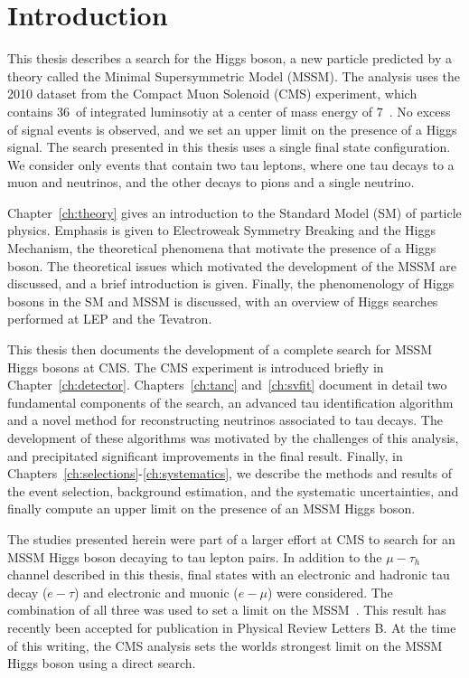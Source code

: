 \ifx\master\undefined\fi
\chapter*{Introduction} 

This thesis describes a search for the Higgs boson, a new particle predicted by
a theory called the Minimal Supersymmetric Model (MSSM).  The analysis uses the
2010 dataset from the Compact Muon Solenoid (CMS) experiment, which contains
36~\pbinv of integrated luminsotiy at a center of mass energy of 7~\TeV.  No
excess of signal events is observed, and we set an upper limit on the presence
of a Higgs signal.  The search presented in this thesis uses a single final
state configuration.  We consider only events that contain two tau leptons,
where one tau decays to a muon and neutrinos,  and the other decays to pions and
a single neutrino.   

Chapter~\ref{ch:theory} gives an introduction to the Standard Model (SM) of
particle physics. Emphasis is given to Electroweak Symmetry Breaking and the
Higgs Mechanism, the theoretical phenomena that motivate the presence of a Higgs
boson.  The theoretical issues which motivated the development of the MSSM are
discussed, and a brief introduction is given. Finally, the phenomenology of
Higgs bosons in the SM and MSSM is discussed, with an overview of Higgs searches
performed at LEP and the Tevatron.

This thesis then documents the development of a complete search for MSSM Higgs
bosons at CMS\@.  The CMS experiment is introduced briefly in
Chapter~\ref{ch:detector}. Chapters~\ref{ch:tanc} and~\ref{ch:svfit} document in
detail two fundamental components of the search, an advanced tau identification
algorithm and a novel method for reconstructing neutrinos associated to tau
decays.  The development of these algorithms was motivated by the challenges of
this analysis, and precipitated significant improvements in the final result.
Finally, in \mbox{Chapters~\ref{ch:selections}-\ref{ch:systematics}}, we
describe the methods and results of the event selection, background estimation,
and the systematic uncertainties, and finally compute an upper limit on the
presence of an MSSM Higgs boson.

The studies presented herein were part of a larger effort at CMS to search for
an MSSM Higgs boson decaying to tau lepton pairs.  In addition to the
$\mu-\tau_h$ channel described in this thesis, final states with an electronic
and hadronic tau decay ($e-\tau$) and electronic and muonic ($e-\mu$) were
considered.  The combination of all three was used to set a limit on the
MSSM~\cite{HIG-10-002}.  This result has recently been accepted for publication
in Physical Review Letters B.  At the time of this writing, the CMS analysis
sets the worlds strongest limit on the MSSM Higgs boson using a direct search.

\ifx\master\undefined\fi
